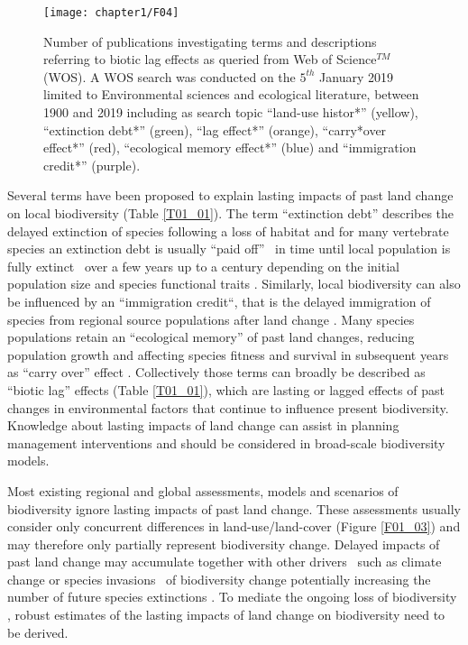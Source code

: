 \begin{figure}[htb]
\centering
\texttt{[image: chapter1/F04]}
\caption{ Number of publications investigating terms and descriptions referring to biotic lag effects as queried from Web of Science$^{TM}$ (WOS). A WOS search was conducted on the $5^{th}$ January 2019 limited to Environmental sciences and ecological literature, between 1900 and 2019 including as search topic    “land-use histor*” (yellow), “extinction debt*” (green), “lag effect*” (orange), “carry*over effect*” (red), “ecological memory effect*” (blue) and “immigration credit*” (purple).  }
\label{F01_04}
\end{figure}

Several terms have been proposed to explain lasting impacts of past land change on local biodiversity (Table \ref{T01_01}). The term “extinction debt” describes the delayed extinction of species following a loss of habitat \citep{Balmford1996,Kuussaari2009,Wearn2012} and for many vertebrate species an extinction debt is usually “paid off” \textendash\ \eg in time until local population is fully extinct \textendash\ over a few years up to a century depending on the initial population size and species functional traits \citep{Halley2016}. Similarly, local biodiversity can also be influenced by an “immigration credit“, that is the delayed immigration of species from regional source populations after land change \citep{Jackson2010,Hylander2013}. Many species populations retain an “ecological memory” \citep{Peterson2002,Bengtsson2003,Ogle2015} of past land changes, reducing population growth and affecting species fitness and survival in subsequent years as “carry over” effect \citep{Harrison2011}. Collectively those terms can broadly be described as “biotic lag” effects (Table \ref{T01_01}), which are lasting or lagged effects of past changes in environmental factors that continue to influence present biodiversity. Knowledge about lasting impacts of land change can assist in planning management interventions \citep{Standish2014} and should be considered in broad-scale biodiversity models.  

Most existing regional and global assessments, models and scenarios of biodiversity \citep[\eg \ those included in the Intergovernmental Science-Policy Platform on Biodiversity and Ecosystem Services (IPBES) assessments, ][]{Alkemade2009,Pereira2010,Newbold2015} ignore lasting impacts of past land change. These assessments usually consider only concurrent differences in land-use/land-cover (Figure \ref{F01_03}) and may therefore only partially represent biodiversity change. Delayed impacts of past land change may accumulate together with other drivers \textendash\ such as climate change or species invasions \textendash\ of biodiversity change \citep{Essl2015,Essl2015a} potentially increasing the number of future species extinctions \citep{Dullinger2013}. To mediate the ongoing loss of biodiversity \citep{Mace2018}, robust estimates of the lasting impacts of land change on biodiversity need to be derived.

